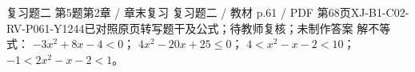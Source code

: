 \par\noindent\begin{minipage}{\linewidth}
\begin{bankitem}{复习题二 第5题}{第2章 / 章末复习 复习题二 / 教材 p.61 / PDF 第68页}{XJ-B1-C02-RV-P061-Y1244}{已对照原页转写题干及公式；待教师复核；未制作答案}
解不等式：
$-3x^2+8x-4<0$；
$4x^2-20x+25\le0$；
$4<x^2-x-2<10$；
$-1<2x^2-x-2<1$。
\end{bankitem}
\end{minipage}\par\medskip
